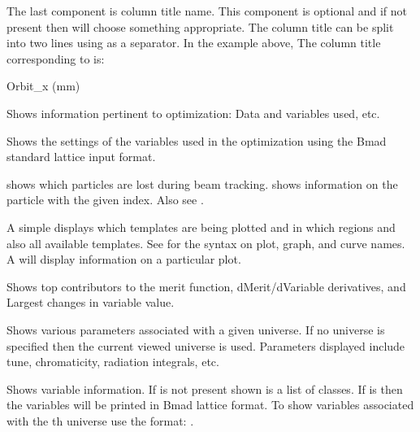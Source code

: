 {\begin{description}
The last component is column title name. This component is optional
and if not present then \tao will choose something appropriate. The
column title can be split into two lines using  as a separator.
In the example above, The column title corresponding to  
is:
\begin{example}
  Orbit_x
   (mm)
\end{example}

  \item[show optimizer]
Shows information pertinent to optimization: Data and variables used, etc.

  \item[show opt\_vars]
Shows the settings of the variables used in the optimization using the 
Bmad standard lattice input format.

  \item[show particle]
 shows which particles are lost during beam
tracking.  shows information on the particle
with the given index. Also see .

  \item[show plot]
A simple  displays which templates are being plotted and
in which regions and also all available templates. See
 for the syntax on plot, graph, and curve names. A
 will display information on a particular
plot.

  \item[show top10]
Shows top contributors to the merit function, dMerit/dVariable
derivatives, and Largest changes in variable value.

  \item[show universe]
Shows various parameters associated with a given universe. If no
universe is specified then the current viewed universe is
used. Parameters displayed include tune, chromaticity, radiation
integrals, etc.

  \item[show variable]
Shows variable information. If   is not
present shown is a list of  classes. If  is
\vn{*} then the variables will be printed in Bmad lattice format.
To show variables associated with the th universe use
the format: .

\end{description}

}
